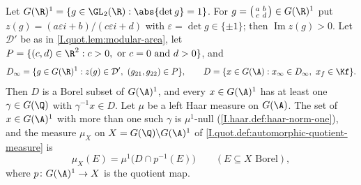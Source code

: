 Let $G(\R)^1=\{g\in\GL_2(\R):\abs{\det g}=1\}$. For $g=\left(\begin{smallmatrix}a&b\\c&d\end{smallmatrix}\right)\in G(\R)^1$ put
$z(g)=(a\varepsilon i+b)/(c\varepsilon i+d)$ with $\varepsilon=\det g\in\{\pm1\}$; then $\operatorname{Im}z(g)>0$. Let $\mathcal D'$ be as in
\cref{I.quot.lem:modular-area}, let $P=\{(c,d)\in\R^2:c>0,\text{ or }c=0\text{ and }d>0\}$, and
\[
  D_\infty=\{g\in G(\R)^1:z(g)\in\mathcal D',\ (g_{21},g_{22})\in P\},\qquad
  D=\{x\in G(\A):x_\infty\in D_\infty,\ x_f\in\Kf\}.
\]
Then $D$ is a Borel subset of $G(\A)^1$, and every $x\in G(\A)^1$ has at least one $\gamma\in G(\Q)$ with $\gamma^{-1}x\in D$. Let $\mu$ be a
left Haar measure on $G(\A)$. The set of $x\in G(\A)^1$ with more than one such $\gamma$ is $\mu^1$-null (\cref{I.haar.def:haar-norm-one}),
and the measure $\mu_X$ on $X=G(\Q)\backslash G(\A)^1$ of \cref{I.quot.def:automorphic-quotient-measure} is
\[
  \mu_X(E)=\mu^1\bigl(D\cap p^{-1}(E)\bigr)\qquad(E\subseteq X\text{ Borel}),
\]
where $p\colon G(\A)^1\to X$ is the quotient map.
